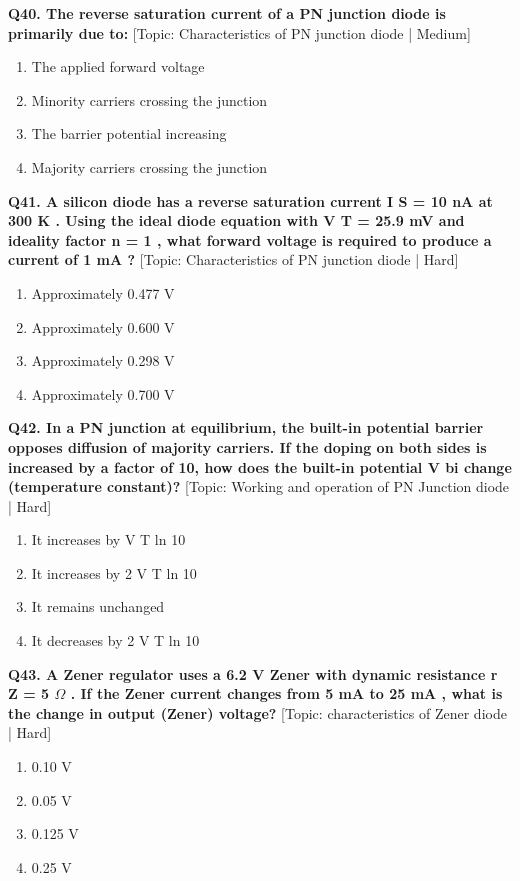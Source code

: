 \noindent\textbf{Q40. The reverse saturation current of a PN junction diode is primarily due to:} \hfill [Topic: Characteristics of PN junction diode | Medium]
\begin{enumerate}[label=(\alph*),topsep=2pt,itemsep=1pt,partopsep=0pt,parsep=0pt]
    \item {The applied forward voltage}
    \item {Minority carriers crossing the junction}
    \item {The barrier potential increasing}
    \item {Majority carriers crossing the junction}
\end{enumerate}
\vspace{2mm}

\noindent\textbf{Q41. A silicon diode has a reverse saturation current I S = 10 nA at 300 K . Using the ideal diode equation with V T = 25.9 mV and ideality factor n = 1 , what forward voltage is required to produce a current of 1 mA ?} \hfill [Topic: Characteristics of PN junction diode | Hard]
\begin{enumerate}[label=(\alph*),topsep=2pt,itemsep=1pt,partopsep=0pt,parsep=0pt]
    \item {Approximately 0.477 V}
    \item {Approximately 0.600 V}
    \item {Approximately 0.298 V}
    \item {Approximately 0.700 V}
\end{enumerate}
\vspace{2mm}

\noindent\textbf{Q42. In a PN junction at equilibrium, the built-in potential barrier opposes diffusion of majority carriers. If the doping on both sides is increased by a factor of 10, how does the built-in potential V bi change (temperature constant)?} \hfill [Topic: Working and operation of PN Junction diode | Hard]
\begin{enumerate}[label=(\alph*),topsep=2pt,itemsep=1pt,partopsep=0pt,parsep=0pt]
    \item {It increases by V T ln 10}
    \item {It increases by 2 V T ln 10}
    \item {It remains unchanged}
    \item {It decreases by 2 V T ln 10}
\end{enumerate}
\vspace{2mm}

\noindent\textbf{Q43. A Zener regulator uses a 6.2 V Zener with dynamic resistance r Z = 5 $\Omega$ . If the Zener current changes from 5 mA to 25 mA , what is the change in output (Zener) voltage?} \hfill [Topic: characteristics of Zener diode | Hard]
\begin{enumerate}[label=(\alph*),topsep=2pt,itemsep=1pt,partopsep=0pt,parsep=0pt]
    \item {0.10 V}
    \item {0.05 V}
    \item {0.125 V}
    \item {0.25 V}
\end{enumerate}
\vspace{2mm}

